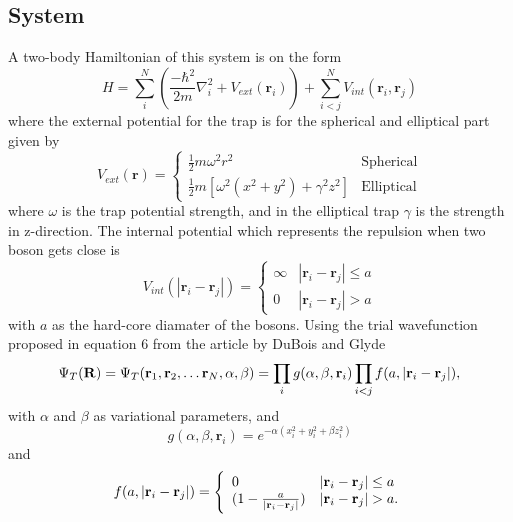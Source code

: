 \documentclass[12pt]{article}
\begin{document}
  \subsection{System}
  A two-body Hamiltonian of this system is on the form
  \begin{equation}
     H = \sum_i^N \left(\frac{-\hbar^2}{2m}\nabla^2_i + V_{ext}(\bm{r}_i)\right) + %
     \sum_{i< j}^N V_{int}(\bm{r}_i,\bm{r}_j)
  \end{equation}
  where the external potential for the trap is for the spherical and elliptical part
  given by
  \begin{equation}
    V_{ext}(\bm{r}) = \left\{%
      \begin{array}{lr}
	\frac{1}{2}m\omega^2r^2 & \text{Spherical}\\
	\frac{1}{2}m[\omega^2(x^2 + y^2) + \gamma^2z^2] & \text{Elliptical}
      \end{array}
      \right.
  \end{equation}
  where $\omega$ is the trap potential strength, and in the elliptical trap $\gamma$ is
  the strength in z-direction.
  The internal potential which represents the repulsion when two boson gets close is
  \begin{equation}
    V_{int}(|\bm{r}_i - \bm{r}_j|) = \left\{%
    \begin{array}{lr}
      \infty & |\bm{r}_i - \bm{r}_j| \leq a\\
      0 & |\bm{r}_i - \bm{r}_j| > a
    \end{array}
    \right.
  \end{equation}
  with $a$ as the hard-core diamater of the bosons.
  Using the trial wavefunction proposed in equation 6 from the article by DuBois and Glyde 
  \cite{BEcond} 
  \begin{equation}
    \Psi_T({\bf R})=\Psi_T({\bf r}_1, {\bf r}_2, \dots {\bf r}_N,\alpha,\beta)=\prod_i%
    g(\alpha,\beta,{\bf r}_i)\prod_{i<j}f(a,|{\bf r}_i-{\bf r}_j|),
    \label{eq:psit}
  \end{equation}
  with $\alpha$ and $\beta$ as variational parameters, and 
  \[ g(\alpha, \beta, \bm{r}_i) = e^{-\alpha(x_i^2 + y_i^2 + \beta z_i^2)} \]
  and
  \begin{equation}
    f(a,|{\bf r}_i-{\bf r}_j|)=\Bigg\{
    \begin{array}{ll}
      0 & {|{\bf r}_i-{\bf r}_j|} \leq {a}\\
	(1-\frac{a}{|{\bf r}_i-{\bf r}_j|}) & {|{\bf r}_i-{\bf r}_j|} > {a}.
    \end{array}
  \end{equation}  
\end{document}

